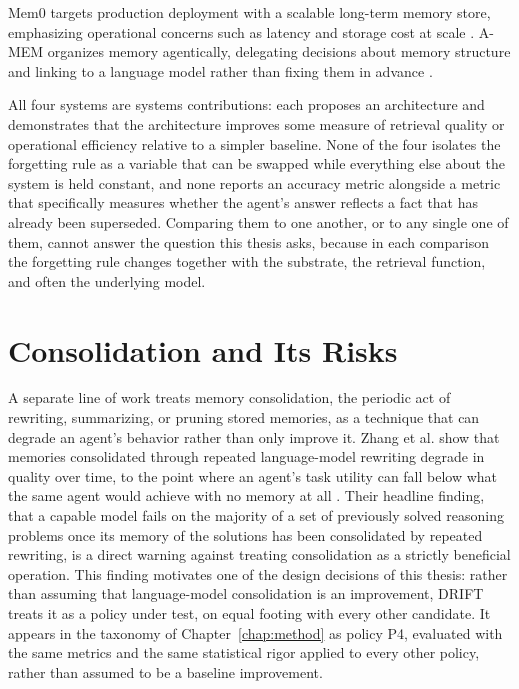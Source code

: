 Mem0 targets production deployment with a scalable long-term memory store, emphasizing operational concerns such as latency and storage cost at scale \citep{chhikara2025mem0}. A-MEM organizes memory agentically, delegating decisions about memory structure and linking to a language model rather than fixing them in advance \citep{xu2025amem}.

All four systems are systems contributions: each proposes an architecture and demonstrates that the architecture improves some measure of retrieval quality or operational efficiency relative to a simpler baseline. None of the four isolates the forgetting rule as a variable that can be swapped while everything else about the system is held constant, and none reports an accuracy metric alongside a metric that specifically measures whether the agent's answer reflects a fact that has already been superseded. Comparing them to one another, or to any single one of them, cannot answer the question this thesis asks, because in each comparison the forgetting rule changes together with the substrate, the retrieval function, and often the underlying model.

\section{Consolidation and Its Risks}
\label{sec:related-consolidation}

A separate line of work treats memory consolidation, the periodic act of rewriting, summarizing, or pruning stored memories, as a technique that can degrade an agent's behavior rather than only improve it. Zhang et al. show that memories consolidated through repeated language-model rewriting degrade in quality over time, to the point where an agent's task utility can fall below what the same agent would achieve with no memory at all \citep{zhang2026faulty}. Their headline finding, that a capable model fails on the majority of a set of previously solved reasoning problems once its memory of the solutions has been consolidated by repeated rewriting, is a direct warning against treating consolidation as a strictly beneficial operation. This finding motivates one of the design decisions of this thesis: rather than assuming that language-model consolidation is an improvement, DRIFT treats it as a policy under test, on equal footing with every other candidate. It appears in the taxonomy of Chapter~\ref{chap:method} as policy P4, evaluated with the same metrics and the same statistical rigor applied to every other policy, rather than assumed to be a baseline improvement.

